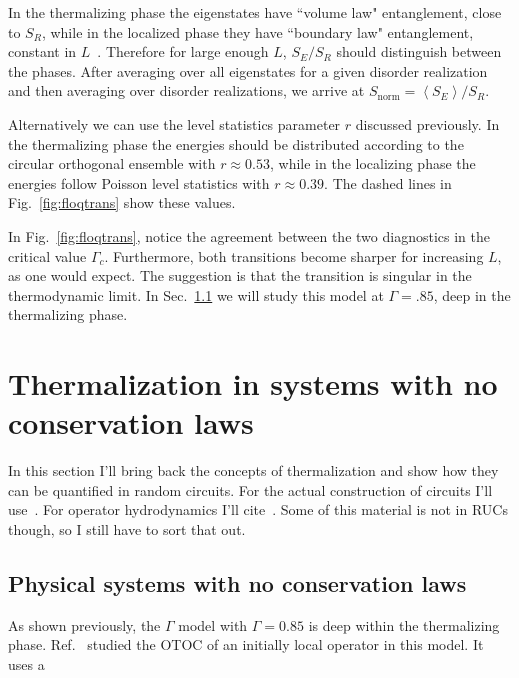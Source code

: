 \documentclass[a4paper,12pt]{article}
\newcommand{\ex}[1]{\left\langle #1 \right\rangle}
\newcommand{\note}[1]{{\color{red}{#1}}}
\begin{document}
In the thermalizing phase the eigenstates have ``volume law" entanglement, close to $S_R$, while in the localized phase they have ``boundary law" entanglement, constant in $L$~\cite{ZhangFloq}. Therefore for large enough $L$, $S_E/S_R$ should distinguish between the phases. After averaging over all eigenstates for a given disorder realization and then averaging over disorder realizations, we arrive at $S_\text{norm} = \ex{S_E}/S_R$.

Alternatively we can use the level statistics parameter $r$ discussed previously. In the thermalizing phase the energies should be distributed according to the circular orthogonal ensemble with $r \approx 0.53$, while in the localizing phase the energies follow Poisson level statistics with $r\approx 0.39$. The dashed lines in Fig.~\ref{fig:floqtrans} show these values.

In Fig.~\ref{fig:floqtrans}, notice the agreement between the two diagnostics in the critical value $\Gamma_c$. Furthermore, both transitions become sharper for increasing $L$, as one would expect. The suggestion is that the transition is singular in the thermodynamic limit. In Sec.~\ref{sub:fncons} we will study this model at $\Gamma=.85$, deep in the thermalizing phase.


\section{Thermalization in systems with no conservation laws} \label{sec:ncons}

In this section I'll bring back the concepts of thermalization and show how they can be quantified in random circuits. For the actual construction of circuits I'll use~\cite{NahumRuhmanHuse, NahumEntanglement}.
For operator hydrodynamics I'll cite~\cite{NahumOpSp, vonKeyserlingkHydro, KhemaniLambda, KhemaniOpSp, JonayEntanglement}. Some of this material is not in RUCs though, so I still have to sort that out.

\subsection{Physical systems with no conservation laws} \label{sub:fncons}

As shown previously, the $\Gamma$ model with $\Gamma=0.85$ is deep within the thermalizing phase. Ref.~\cite{ChenOtoc} studied the OTOC of an initially local operator in this model. It uses a \note{slightly different definition of the OTOC...}
\end{document}
